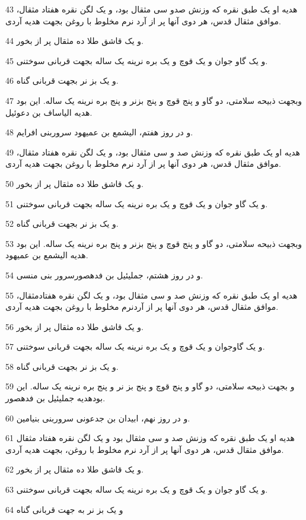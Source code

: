 \par 43 هدیه او یک طبق نقره که وزنش صدو سی مثقال بود، و یک لگن نقره هفتاد مثقال، موافق مثقال قدس، هر دوی آنها پر از آرد نرم مخلوط با روغن بجهت هدیه آردی.
\par 44 و یک قاشق طلا ده مثقال پر از بخور.
\par 45 و یک گاو جوان و یک قوچ و یک بره نرینه یک ساله بجهت قربانی سوختنی.
\par 46 و یک بز نر بجهت قربانی گناه.
\par 47 وبجهت ذبیحه سلامتی، دو گاو و پنج قوچ و پنج بزنر و پنج بره نرینه یک ساله. این بود هدیه الیاساف بن دعوئیل.
\par 48 و در روز هفتم، الیشمع بن عمیهود سروربنی افرایم.
\par 49 هدیه او یک طبق نقره که وزنش صد و سی مثقال بود، و یک لگن نقره هفتاد مثقال، موافق مثقال قدس، هر دوی آنها پر از آرد نرم مخلوط با روغن بجهت هدیه آردی. 
\par 50 و یک قاشق طلا ده مثقال پر از بخور.
\par 51 و یک گاو جوان و یک قوچ و یک بره نرینه یک ساله بجهت قربانی سوختنی.
\par 52 و یک بز نر بجهت قربانی گناه.
\par 53 وبجهت ذبیحه سلامتی، دو گاو و پنج قوچ و پنج بزنر و پنج بره نرینه یک ساله. این بود هدیه الیشمع بن عمیهود.
\par 54 و در روز هشتم، جملیئیل بن فدهصورسرور بنی منسی.
\par 55 هدیه او یک طبق نقره که وزنش صد و سی مثقال بود، و یک لگن نقره هفتادمثقال، موافق مثقال قدس، هر دوی آنها پر از آردنرم مخلوط با روغن بجهت هدیه آردی.
\par 56 و یک قاشق طلا ده مثقال پر از بخور.
\par 57 و یک گاوجوان و یک قوچ و یک بره نرینه یک ساله بجهت قربانی سوختنی.
\par 58 و یک بز نر بجهت قربانی گناه.
\par 59 و بجهت ذبیحه سلامتی، دو گاو و پنج قوچ و پنج بز نر و پنج بره نرینه یک ساله. این بودهدیه جملیئیل بن فدهصور.
\par 60 و در روز نهم، ابیدان بن جدعونی سروربنی بنیامین.
\par 61 هدیه او یک طبق نقره که وزنش صد و سی مثقال بود و یک لگن نقره هفتاد مثقال موافق مثقال قدس، هر دوی آنها پر از آرد نرم مخلوط با روغن، بجهت هدیه آردی.
\par 62 و یک قاشق طلا ده مثقال پر از بخور.
\par 63 و یک گاو جوان و یک قوچ و یک بره نرینه یک ساله بجهت قربانی سوختنی.
\par 64 و یک بز نر به جهت قربانی گناه
